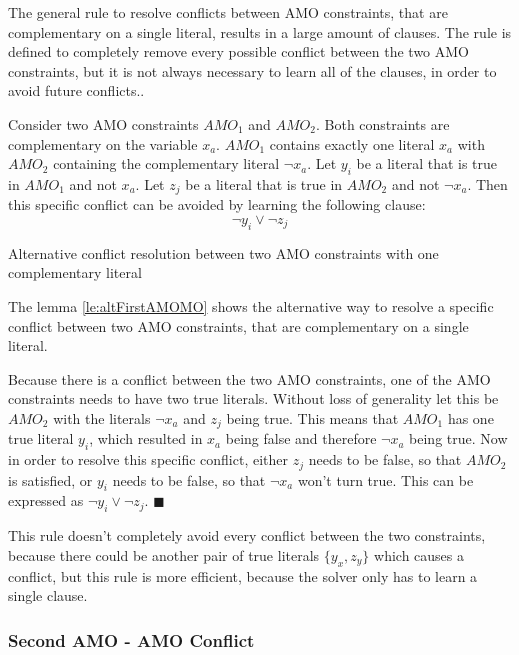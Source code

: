 The general rule to resolve conflicts between AMO constraints, that are complementary on a single literal, results in a large amount of clauses. The rule is defined to completely remove every possible conflict between the two AMO constraints, but it is not always necessary to learn all of the clauses, in order to avoid future conflicts..

\begin{lemma}
\begin{leftbar}
Consider two AMO constraints $AMO_1$ and $AMO_2$. Both constraints are complementary on the variable $x_a$. $AMO_1$ contains exactly one literal $x_a$ with $AMO_2$ containing the complementary literal $\neg x_a$. Let $y_i$ be a literal that is true in $AMO_1$ and not $x_a$. Let $z_j$ be a literal that is true in $AMO_2$ and not $\neg x_a$. Then this specific conflict can be avoided by learning the following clause:
\begin{displaymath}
\neg y_i \vee \neg z_j
\end{displaymath}
\end{leftbar}
\caption{Alternative conflict resolution between two AMO constraints with one complementary literal}
\label{le:altFirstAMOMO}
\end{lemma}

The lemma \ref{le:altFirstAMOMO} shows the alternative way to resolve a specific conflict between two AMO constraints, that are complementary on a single literal.

Because there is a conflict between the two AMO constraints, one of the AMO constraints needs to have two true literals. Without loss of generality let this be $AMO_2$ with the literals $\neg x_a$ and $z_j$ being true. This means that $AMO_1$ has one true literal $y_i$, which resulted in $x_a$ being  false and therefore $\neg x_a$ being true. Now in order to resolve this specific conflict, either $z_j$ needs to be false, so that $AMO_2$ is satisfied, or $y_i$ needs to be false, so that $\neg x_a$ won't turn true. This can be expressed as $\neg y_i \vee \neg z_j$. $\blacksquare$

This rule doesn't completely avoid every conflict between the two constraints, because there could be another pair of true literals $\{y_x,z_y\}$ which causes a conflict, but this rule is more efficient, because the solver only has to learn a single clause.

\subsubsection{Second AMO - AMO Conflict}

